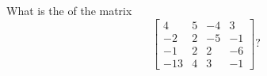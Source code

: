 \begin{activity}
What is the  of the matrix
\begin{equation*}
\begin{bmatrix} 4&5&-4&3
\\-2&2&-5&-1
\\-1&2&2&-6
\\-13&4&3&-1 \end{bmatrix}?
\end{equation*}
\end{activity}



